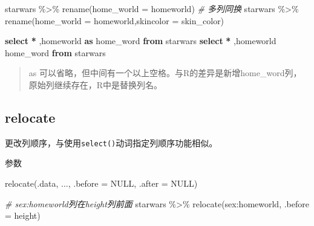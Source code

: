 \documentclass[
]{book}
\newenvironment{Shaded}{\begin{snugshade}}{\end{snugshade}}
\newcommand{\AttributeTok}[1]{\textcolor[rgb]{0.77,0.63,0.00}{#1}}
\newcommand{\CommentTok}[1]{\textcolor[rgb]{0.56,0.35,0.01}{\textit{#1}}}
\newcommand{\ConstantTok}[1]{\textcolor[rgb]{0.00,0.00,0.00}{#1}}
\newcommand{\FunctionTok}[1]{\textcolor[rgb]{0.00,0.00,0.00}{#1}}
\newcommand{\KeywordTok}[1]{\textcolor[rgb]{0.13,0.29,0.53}{\textbf{#1}}}
\newcommand{\NormalTok}[1]{#1}
\newcommand{\OperatorTok}[1]{\textcolor[rgb]{0.81,0.36,0.00}{\textbf{#1}}}
\newcommand{\SpecialCharTok}[1]{\textcolor[rgb]{0.00,0.00,0.00}{#1}}
\begin{document}
\begin{Shaded}
\begin{Highlighting}[]
\NormalTok{starwars }\SpecialCharTok{\%\textgreater{}\%} \FunctionTok{rename}\NormalTok{(}\AttributeTok{home\_world =}\NormalTok{ homeworld)}
\CommentTok{\# 多列同换}
\NormalTok{starwars }\SpecialCharTok{\%\textgreater{}\%} \FunctionTok{rename}\NormalTok{(}\AttributeTok{home\_world =}\NormalTok{ homeworld,}\AttributeTok{skincolor =}\NormalTok{ skin\_color)}
\end{Highlighting}
\end{Shaded}

\begin{Shaded}
\begin{Highlighting}[]
\KeywordTok{select} \OperatorTok{*}\NormalTok{ ,homeworld }\KeywordTok{as}\NormalTok{ home\_word }\KeywordTok{from}\NormalTok{ starwars }
\KeywordTok{select} \OperatorTok{*}\NormalTok{ ,homeworld  home\_word }\KeywordTok{from}\NormalTok{ starwars }
\end{Highlighting}
\end{Shaded}

\begin{quote}
as 可以省略，但中间有一个以上空格。与R的差异是新增home\_word列，原始列继续存在，R中是替换列名。
\end{quote}

\hypertarget{relocate}{%
\subsection{relocate}\label{relocate}}

更改列顺序，与使用\texttt{select()}动词指定列顺序功能相似。

参数

\begin{Shaded}
\begin{Highlighting}[]
\FunctionTok{relocate}\NormalTok{(.data, ..., }\AttributeTok{.before =} \ConstantTok{NULL}\NormalTok{, }\AttributeTok{.after =} \ConstantTok{NULL}\NormalTok{)}
\end{Highlighting}
\end{Shaded}

\begin{Shaded}
\begin{Highlighting}[]
\CommentTok{\# sex:homeworld列在height列前面}
\NormalTok{starwars }\SpecialCharTok{\%\textgreater{}\%} \FunctionTok{relocate}\NormalTok{(sex}\SpecialCharTok{:}\NormalTok{homeworld, }\AttributeTok{.before =}\NormalTok{ height)}
\end{Highlighting}
\end{Shaded}
\end{document}
